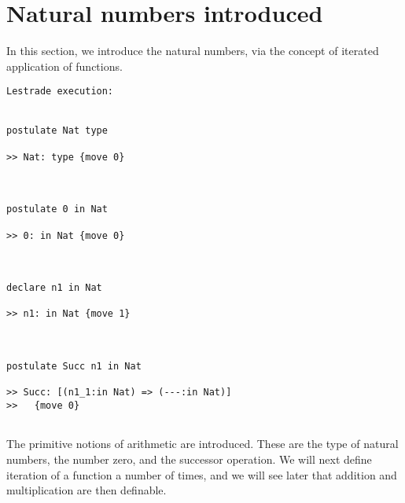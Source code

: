 \documentclass[12pt]{article}
\begin{document}
\section{Natural numbers introduced}




In this section, we introduce the natural numbers, via the concept of iterated application of functions.

\begin{verbatim}Lestrade execution:


postulate Nat type

>> Nat: type {move 0}



postulate 0 in Nat

>> 0: in Nat {move 0}



declare n1 in Nat

>> n1: in Nat {move 1}



postulate Succ n1 in Nat

>> Succ: [(n1_1:in Nat) => (---:in Nat)]
>>   {move 0}


\end{verbatim}

The primitive notions of arithmetic are introduced.  These are the type of natural numbers, the number zero, and the successor operation.  We will next define iteration of a function a number of times, and we will see later that addition and multiplication are then definable.
\end{document}
